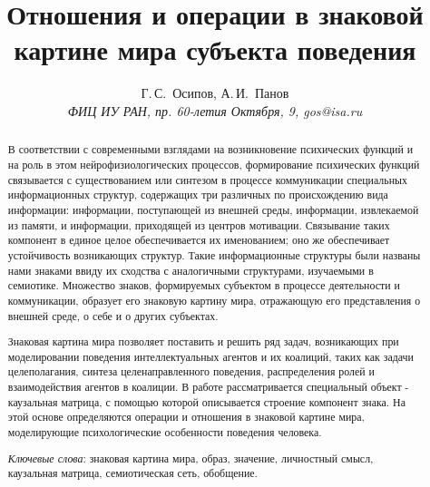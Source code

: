 \documentclass[12pt]{scrartcl}
\title{Отношения и операции в знаковой картине мира субъекта поведения}
\author{Г.\,С.~Осипов, А.\,И.~Панов\\
	{\large\slshape ФИЦ ИУ РАН, пр. 60-летия Октября, 9, gos@isa.ru}}
\begin{document}
	
	\maketitle{}
	\begin{abstract}
		В соответствии с современными взглядами на возникновение психических функций и на роль в этом  нейрофизиологических процессов, формирование психических функций связывается с существованием или синтезом в процессе коммуникации специальных информационных структур, содержащих три различных по происхождению вида информации: информации, поступающей из внешней среды, информации, извлекаемой из памяти, и информации, приходящей из центров мотивации. Связывание таких компонент в единое целое обеспечивается их именованием; оно же обеспечивает устойчивость возникающих структур. Такие информационные структуры были названы нами знаками ввиду их сходства с аналогичными структурами, изучаемыми в семиотике. Множество знаков, формируемых субъектом в процессе деятельности и коммуникации, образует его знаковую картину мира, отражающую его представления о внешней среде, о себе и о других субъектах.
		
		Знаковая картина мира позволяет поставить и решить ряд задач, возникающих при моделировании поведения интеллектуальных агентов и их коалиций, таких как задачи целеполагания, синтеза целенаправленного поведения, распределения ролей и взаимодействия агентов в коалиции. В работе рассматривается специальный объект - каузальная матрица, с помощью которой описывается строение компонент знака. На этой основе определяются операции и отношения в знаковой картине мира, моделирующие психологические особенности поведения человека. 
		
		\par\bigskip
		\textit{Ключевые слова}: знаковая картина мира, образ, значение, личностный смысл, каузальная матрица, семиотическая сеть, обобщение.
	\end{abstract}
	
	
\end{document}
